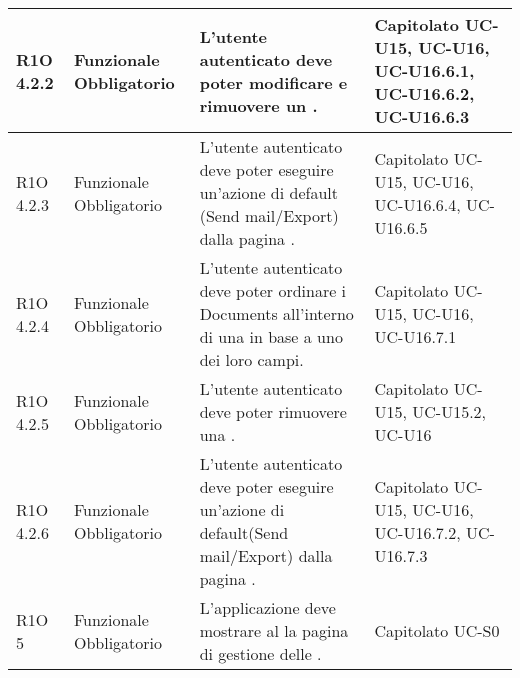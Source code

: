 \begin{center}
\begin{longtable}{ | l | p{2cm} | p{4.7cm} | p{2cm} |}
	R1O 4.2.2 & Funzionale \newline Obbligatorio & L’utente autenticato deve poter modificare e rimuovere un \glossaryItem{Document}. &  Capitolato \newline UC-U15, UC-U16, UC-U16.6.1, UC-U16.6.2, UC-U16.6.3  \newline  \\ \hline
	
	R1O 4.2.3 & Funzionale \newline Obbligatorio & L’utente autenticato deve poter eseguire un’azione di default (Send mail/Export) dalla pagina \glossaryItem{Document}.&  Capitolato \newline UC-U15, UC-U16, UC-U16.6.4, UC-U16.6.5  \newline  \\ \hline
	
	R1O 4.2.4 & Funzionale \newline Obbligatorio & L’utente autenticato deve poter ordinare i Documents all’interno di una \glossaryItem{Collection} in base a uno dei loro campi. &  Capitolato \newline UC-U15, UC-U16, UC-U16.7.1  \newline  \\ \hline
	
	R1O 4.2.5 & Funzionale \newline Obbligatorio & L’utente autenticato deve poter rimuovere una \glossaryItem{Collection}. &  Capitolato \newline UC-U15, UC-U15.2, UC-U16  \newline  \\ \hline
	
	R1O 4.2.6 & Funzionale \newline Obbligatorio & L’utente autenticato deve poter eseguire un’azione di default(Send mail/Export) dalla pagina \glossaryItem{Collection}. &  Capitolato \newline UC-U15, UC-U16, UC-U16.7.2, UC-U16.7.3  \newline  \\ \hline
	
	R1O 5 & Funzionale \newline Obbligatorio & L'applicazione deve mostrare al \glossaryItem{Super-Admin} la pagina di gestione delle \glossaryItem{Company}. &  Capitolato \newline UC-S0  \newline  \\ \hline
	

\end{longtable}
\end{center}
